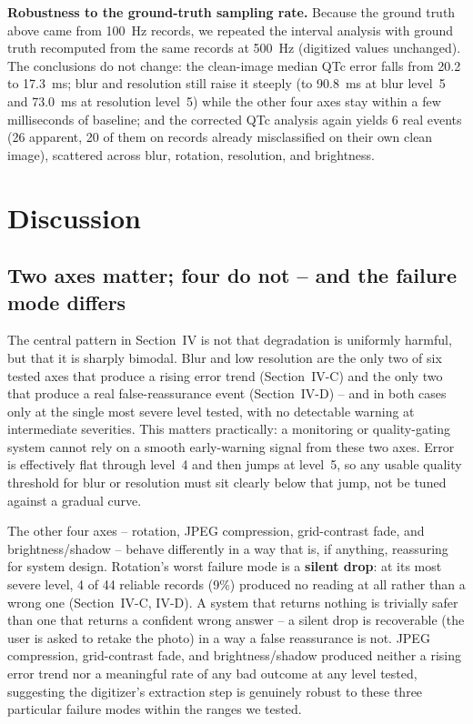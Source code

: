 \documentclass[conference]{IEEEtran}
\begin{document}
\textbf{Robustness to the ground-truth sampling rate.} Because the ground truth above
came from 100~Hz records, we repeated the interval analysis with ground truth
recomputed from the same records at 500~Hz (digitized values unchanged). The
conclusions do not change: the clean-image median QTc error falls from 20.2 to
17.3~ms; blur and resolution still raise it steeply (to 90.8~ms at blur level~5 and
73.0~ms at resolution level~5) while the other four axes stay within a few
milliseconds of baseline; and the corrected QTc analysis again yields 6 real events
(26 apparent, 20 of them on records already misclassified on their own clean image),
scattered across blur, rotation, resolution, and brightness.

\section{Discussion}

\subsection{Two axes matter; four do not -- and the failure mode differs}

The central pattern in Section~IV is not that degradation is uniformly harmful, but
that it is sharply bimodal. Blur and low resolution are the only two of six tested
axes that produce a rising error trend (Section~IV-C) and the only two that produce a
real false-reassurance event (Section~IV-D) -- and in both cases only at the single
most severe level tested, with no detectable warning at intermediate severities. This
matters practically: a monitoring or quality-gating system cannot rely on a smooth
early-warning signal from these two axes. Error is effectively flat through level~4
and then jumps at level~5, so any usable quality threshold for blur or resolution
must sit clearly below that jump, not be tuned against a gradual curve.

The other four axes -- rotation, JPEG compression, grid-contrast fade, and
brightness/shadow -- behave differently in a way that is, if anything, reassuring for
system design. Rotation's worst failure mode is a \textbf{silent drop}: at its most
severe level, 4 of 44 reliable records (9\%) produced no reading at all rather than a
wrong one (Section~IV-C, IV-D). A system that returns nothing is trivially safer than
one that returns a confident wrong answer -- a silent drop is recoverable (the user
is asked to retake the photo) in a way a false reassurance is not. JPEG compression,
grid-contrast fade, and brightness/shadow produced neither a rising error trend nor a
meaningful rate of any bad outcome at any level tested, suggesting the digitizer's
extraction step is genuinely robust to these three particular failure modes within
the ranges we tested.
\end{document}
